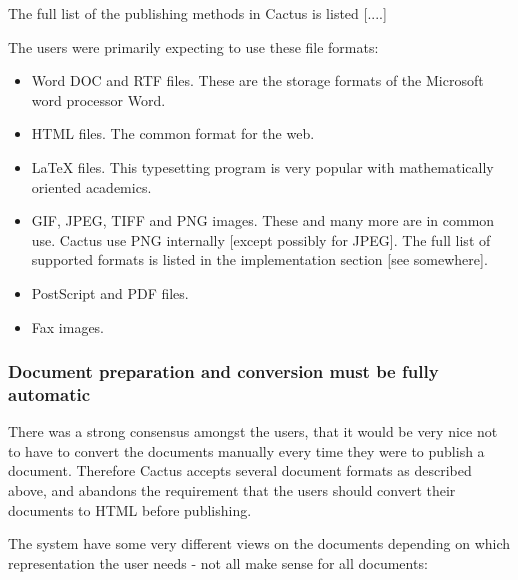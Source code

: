 The full list of the publishing methods in Cactus is listed
[....]

The users were primarily expecting to use these file
formats:

\begin{itemize}
  
\item Word DOC and RTF files.  These are the storage formats
  of the Microsoft word processor Word.
\item HTML files.  The common format for the web.
\item LaTeX files.  This typesetting program is very popular
  with mathematically oriented academics.
\item GIF, JPEG, TIFF and PNG images.  These and many more
  are in common use.  Cactus use PNG internally [except
  possibly for JPEG].  The full list of supported formats is
  listed in the implementation section [see somewhere].
\item PostScript and PDF files.
\item Fax images.
\end{itemize}

\subsubsection{Document preparation and conversion must be fully automatic}

There was a strong consensus amongst the users, that it
would be very nice not to have to convert the documents
manually every time they were to publish a document.
Therefore Cactus accepts several document formats as
described above, and abandons the requirement that the users
should convert their documents to HTML before publishing.

The system have some very different views on the documents
depending on which representation the user needs - not all
make sense for all documents:

